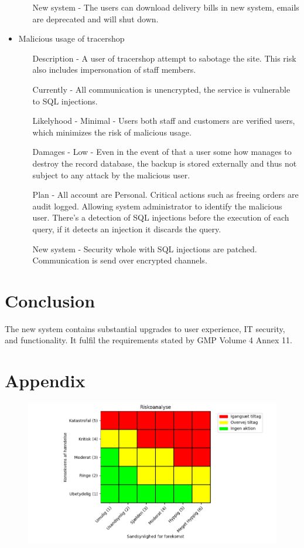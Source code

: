 \documentclass{article}
\begin{document}
\begin{itemize}
\begin{itemize}
    \item[New system] - The users can download delivery bills in new system, emails are deprecated and will shut down.
  \end{itemize}
  \item Malicious usage of tracershop
  \begin{itemize}
    \item[Description] - A user of tracershop attempt to sabotage the site. This risk also includes impersonation of staff members.
    \item[Currently] - All communication is unencrypted, the service is vulnerable to SQL injections.
    \item[Likelyhood] - Minimal - Users both staff and customers are verified users, which minimizes the risk of malicious usage.
    \item[Damages] - Low - Even in the event of that a user some how manages to destroy the record database, the backup is stored externally and thus not subject to any attack by the malicious user.
    \item[Plan] - All account are Personal. Critical actions such as freeing orders are audit logged. Allowing system administrator to identify the malicious user.
    There's a detection of SQL injections before the execution of each query, if it detects an injection it discards the query.
    \item[New system] - Security whole with SQL injections are patched. Communication is send over encrypted channels.
  \end{itemize}
\end{itemize}


\section*{Conclusion}

The new system contains substantial upgrades to user experience, IT security, and functionality. It fulfil the requirements stated by GMP Volume 4 Annex 11.

\clearpage

\printglossary[type=main,style=long,nonumberlist]

\clearpage

\section*{Appendix}

\begin{figure}[ht]
  \begin{center}
    \includegraphics[width=\textwidth]{figures/risk_analyse.png}
  \end{center}
\end{figure}
\end{document}
